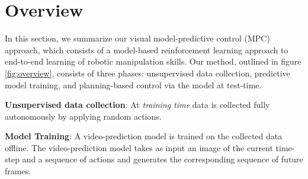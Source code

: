 \section{Overview}\label{sec:prelim}
\label{sec:vmpc}

In this section, we summarize our visual model-predictive control (MPC) approach, which consists of a model-based reinforcement learning approach to end-to-end learning of robotic manipulation skills. Our method, outlined in figure \ref{fig:overview}, consists of three phases: unsupervised data collection, predictive model training, and planning-based control via the model at test-time.

\textbf{Unsupervised data collection}: At \emph{training time} data is collected fully autonomously by applying random actions.

\textbf{Model Training}: A video-prediction model is trained on the collected data offline. The video-prediction model takes as input an image of the current time-step and a sequence of actions and generates the corresponding sequence of future frames. 

